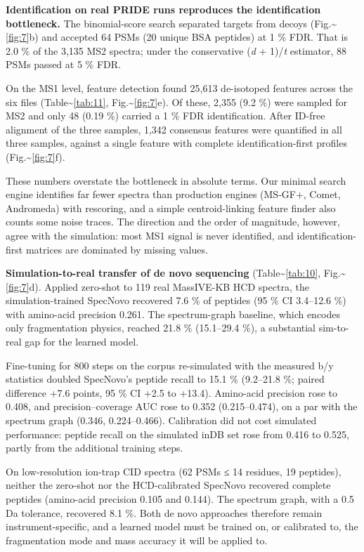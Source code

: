 \documentclass{sn-preview}
\begin{document}
\textbf{Identification on real PRIDE runs reproduces the identification bottleneck.} The binomial-score search separated targets from decoys (Fig.\textasciitilde{}\ref{fig:7}b) and accepted 64 PSMs (20 unique BSA peptides) at 1 \% FDR. That is 2.0 \% of the 3,135 MS2 spectra; under the conservative (\emph{d} + 1)/\emph{t} estimator, 88 PSMs passed at 5 \% FDR.

On the MS1 level, feature detection found 25,613 de-isotoped features across the six files (Table\textasciitilde{}\ref{tab:11}, Fig.\textasciitilde{}\ref{fig:7}e). Of these, 2,355 (9.2 \%) were sampled for MS2 and only 48 (0.19 \%) carried a 1 \% FDR identification. After ID-free alignment of the three samples, 1,342 consensus features were quantified in all three samples, against a single feature with complete identification-first profiles (Fig.\textasciitilde{}\ref{fig:7}f).

These numbers overstate the bottleneck in absolute terms. Our minimal search engine identifies far fewer spectra than production engines (MS-GF+, Comet, Andromeda) with rescoring, and a simple centroid-linking feature finder also counts some noise traces. The direction and the order of magnitude, however, agree with the simulation: most MS1 signal is never identified, and identification-first matrices are dominated by missing values.

\textbf{Simulation-to-real transfer of de novo sequencing} (Table\textasciitilde{}\ref{tab:10}, Fig.\textasciitilde{}\ref{fig:7}d). Applied zero-shot to 119 real MassIVE-KB HCD spectra, the simulation-trained SpecNovo recovered 7.6 \% of peptides (95 \% CI 3.4--12.6 \%) with amino-acid precision 0.261. The spectrum-graph baseline, which encodes only fragmentation physics, reached 21.8 \% (15.1--29.4 \%), a substantial sim-to-real gap for the learned model.

Fine-tuning for 800 steps on the corpus re-simulated with the measured b/y statistics doubled SpecNovo's peptide recall to 15.1 \% (9.2--21.8 \%; paired difference +7.6 points, 95 \% CI +2.5 to +13.4). Amino-acid precision rose to 0.408, and precision--coverage AUC rose to 0.352 (0.215--0.474), on a par with the spectrum graph (0.346, 0.224--0.466). Calibration did not cost simulated performance: peptide recall on the simulated inDB set rose from 0.416 to 0.525, partly from the additional training steps.

On low-resolution ion-trap CID spectra (62 PSMs ≤ 14 residues, 19 peptides), neither the zero-shot nor the HCD-calibrated SpecNovo recovered complete peptides (amino-acid precision 0.105 and 0.144). The spectrum graph, with a 0.5 Da tolerance, recovered 8.1 \%. Both de novo approaches therefore remain instrument-specific, and a learned model must be trained on, or calibrated to, the fragmentation mode and mass accuracy it will be applied to.
\end{document}
